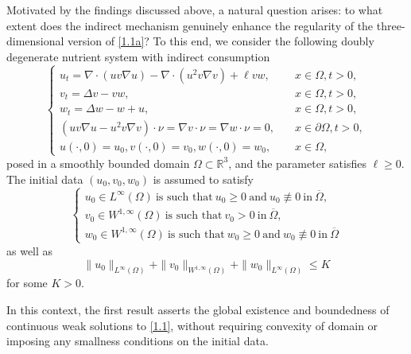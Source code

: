\documentclass[12pt]{article}
\theoremstyle{plain}
\theoremstyle{definition}
\numberwithin{equation}{section}
\begin{document}
 Motivated by the findings discussed above,  a natural question arises: to what extent does the indirect mechanism genuinely enhance the
 regularity of the three-dimensional  version of \eqref{1.1a}?
To this end, we consider the
following  doubly degenerate nutrient system with indirect consumption
\begin{equation}\label{1.1}
	\left\{\begin{array}{ll}
		u_{t}=\nabla\cdot(uv\nabla u)-\nabla\cdot(u^2v\nabla v)+\ell vw,& \quad x\in\Omega, t>0,\\
		v_{t}=\Delta v-vw,&\quad x\in\Omega, t>0,\\
		w_{t}=\Delta w-w+u,&\quad x\in\Omega, t>0,\\
	(uv\nabla u-u^2v\nabla v)\cdot\nu=\nabla v\cdot\nu=\nabla w\cdot\nu=0,
&\quad x\in\partial\Omega, t>0,\\
		u(\cdot,0)=u_{0},v(\cdot,0)=v_{0},w(\cdot,0)=w_{0},&\quad x\in\Omega,
	\end{array}
		\right.
\end{equation}
posed in a smoothly bounded domain $\Omega\subset\mathbb{R}^3$, and the parameter satisfies $\ell\geq0$. The initial data $(u_0,v_0,w_0)$ is assumed to satisfy
\begin{equation}\label{1.2}
    \left\{
    \begin{array}{l}
        u_0\in L^{\infty}(\Omega)~\mbox{is such that}~u_0\geq0~\mbox{and}~u_0\not\equiv0 ~\mbox{in}~\overline\Omega,\\
        v_0\in W^{1,\infty}(\Omega)~\mbox{is such that}~v_0>0~\mbox{in}~\overline\Omega,\\
        w_0\in W^{1,\infty}(\Omega)~\mbox{is such that}~w_0\geq0~\mbox{and}~w_0\not\equiv0~\mbox{in}~\overline\Omega
    \end{array}
    \right.
\end{equation}
as well as
\begin{equation}\label{1.6}
    \|u_0\|_{L^\infty(\Omega)}+\|v_0\|_{W^{1,\infty}(\Omega)}+\| w_0\|_{L^\infty(\Omega)}\leq K
\end{equation}
for some $K>0$.

In this context, the first result asserts  the global existence and  boundedness of continuous weak solutions to  \eqref{1.1}, without requiring convexity of domain or imposing any smallness conditions on the initial data.
\end{document}
